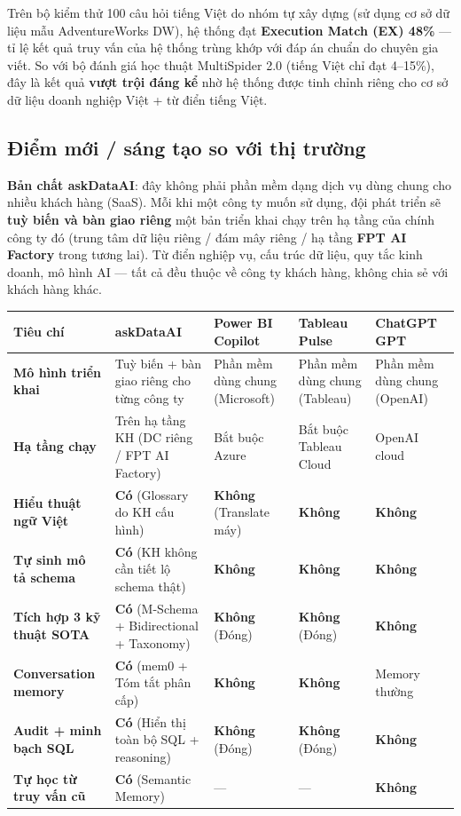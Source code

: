 \documentclass[11pt,a4paper]{article}
\newcommand{\yes}{\textbf{Có}}
\newcommand{\no}{\textbf{Không}}
\begin{document}
Trên bộ kiểm thử 100 câu hỏi tiếng Việt do nhóm tự xây dựng (sử dụng cơ sở dữ liệu mẫu AdventureWorks DW), hệ thống đạt \textbf{Execution Match (EX) 48\%} --- tỉ lệ kết quả truy vấn của hệ thống trùng khớp với đáp án chuẩn do chuyên gia viết. So với bộ đánh giá học thuật MultiSpider 2.0 (tiếng Việt chỉ đạt 4--15\%), đây là kết quả \textbf{vượt trội đáng kể} nhờ hệ thống được tinh chỉnh riêng cho cơ sở dữ liệu doanh nghiệp Việt + từ điển tiếng Việt.

\subsection{Điểm mới / sáng tạo so với thị trường}

\textbf{Bản chất askDataAI}: đây không phải phần mềm dạng dịch vụ dùng chung cho nhiều khách hàng (SaaS). Mỗi khi một công ty muốn sử dụng, đội phát triển sẽ \textbf{tuỳ biến và bàn giao riêng} một bản triển khai chạy trên hạ tầng của chính công ty đó (trung tâm dữ liệu riêng / đám mây riêng / hạ tầng \textbf{FPT AI Factory} trong tương lai). Từ điển nghiệp vụ, cấu trúc dữ liệu, quy tắc kinh doanh, mô hình AI --- tất cả đều thuộc về công ty khách hàng, không chia sẻ với khách hàng khác.

\begin{longtable}{|L{3.6cm}|L{3.4cm}|L{2.8cm}|L{2.5cm}|L{2.5cm}|}
\hline
{}\textbf{Tiêu chí} & \textbf{askDataAI} & \textbf{Power BI Copilot} & \textbf{Tableau Pulse} & \textbf{ChatGPT GPT} \\
\hline\endhead

\textbf{Mô hình triển khai} & Tuỳ biến + bàn giao riêng cho từng công ty & Phần mềm dùng chung (Microsoft) & Phần mềm dùng chung (Tableau) & Phần mềm dùng chung (OpenAI) \\ \hline
\textbf{Hạ tầng chạy} & Trên hạ tầng KH (DC riêng / FPT AI Factory) & Bắt buộc Azure & Bắt buộc Tableau Cloud & OpenAI cloud \\ \hline
\textbf{Hiểu thuật ngữ Việt} & \yes{} (Glossary do KH cấu hình) & \no{} (Translate máy) & \no{} & \no{} \\ \hline
\textbf{Tự sinh mô tả schema} & \yes{} (KH không cần tiết lộ schema thật) & \no{} & \no{} & \no{} \\ \hline
\textbf{Tích hợp 3 kỹ thuật SOTA} & \yes{} (M-Schema + Bidirectional + Taxonomy) & \no{} (Đóng) & \no{} (Đóng) & \no{} \\ \hline
\textbf{Conversation memory} & \yes{} (mem0 + Tóm tắt phân cấp) & \no{} & \no{} & Memory thường \\ \hline
\textbf{Audit + minh bạch SQL} & \yes{} (Hiển thị toàn bộ SQL + reasoning) & \no{} (Đóng) & \no{} (Đóng) & \no{} \\ \hline
\textbf{Tự học từ truy vấn cũ} & \yes{} (Semantic Memory) & --- & --- & \no{} \\ \hline

\end{longtable}
\end{document}

